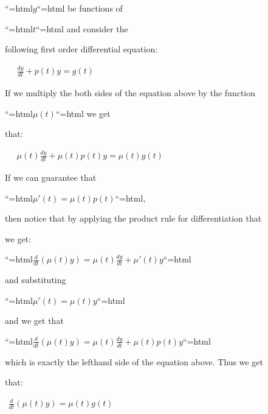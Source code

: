 ``{=html}$g$``{=html} be functions of

``{=html}$t$``{=html} and consider the

following first order differential equation:







$\begin{aligned} \quad \frac{dy}{dt} + p(t) y = g(t) \end{aligned}$







If we multiply the both sides of the equation above by the function

``{=html}$\mu (t)$``{=html} we get

that:







$\begin{aligned} \quad \mu (t) \frac{dy}{dt} + \mu (t) p(t) y = \mu (t) g(t) \end{aligned}$







If we can guarantee that

``{=html}$\mu ' (t) = \mu (t) p(t)$``{=html},

then notice that by applying the product rule for differentiation that

we get:

``{=html}$\frac{d}{dt} \left ( \mu (t) y \right ) = \mu (t) \frac{dy}{dt} + \mu ' (t) y$``{=html}

and substituting

``{=html}$\mu ' (t) = \mu (t) y$``{=html}

and we get that

``{=html}$\frac{d}{dt} \left ( \mu (t) y \right ) = \mu (t) \frac{dy}{dt} + \mu (t) p(t) y$``{=html}

which is exactly the lefthand side of the equation above. Thus we get

that:







$\begin{aligned} \frac{d}{dt} \left ( \mu (t) y \right ) = \mu (t) g(t) \\\\ \end{aligned}$







